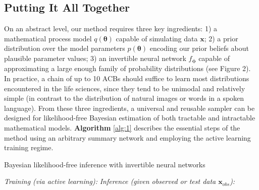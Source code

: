 \documentclass[9pt,twoside,lineno]{pnas-new}
\begin{document}
\subsection*{Putting It All Together}

On an abstract level, our method requires three key ingredients: 1) a mathematical process model $q(\boldsymbol{\theta})$ capable of simulating data $\boldsymbol{x}$; 2) a prior distribution over the model parameters $p(\boldsymbol{\theta})$ encoding our prior beliefs about plausible parameter values; 3) an invertible neural network $f_{\boldsymbol{\phi}}$ capable of approximating a large enough family of probability distributions (see Figure 2). In practice, a chain of up to 10 ACBs should suffice to learn most distributions encountered in the life sciences, since they tend to be unimodal and relatively simple (in contrast to the distribution of natural images or words in a spoken language). From these three ingredients, a universal and reusable sampler can be designed for likelihood-free Bayesian estimation of both tractable and intractable mathematical models. \textbf{Algorithm} \ref{alg:1} describes the essential steps of the method using an arbitrary summary network and employing the active learning training regime.

\begin{algorithm}
\caption{Bayesian likelihood-free inference with invertible neural networks}\label{alg:1}
\begin{algorithmic}[1]
\State \emph{Training (via active learning):}
\Repeat
{}
\State \emph{Inference (given observed or test data $\boldsymbol{x}_{obs}$):}
\EndFor
{}
\end{algorithmic}
\end{algorithm}
\end{document}
